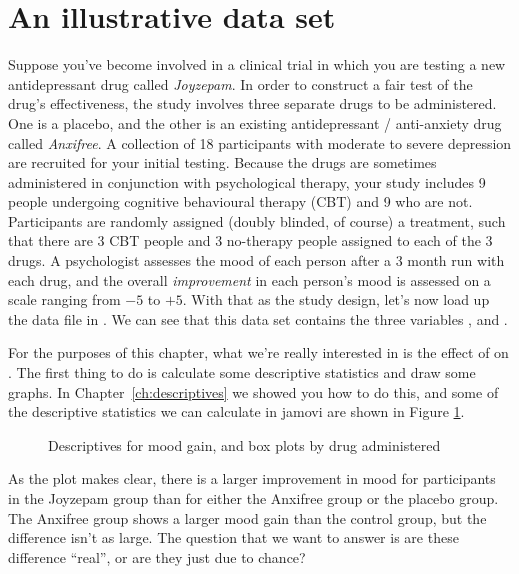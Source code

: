 \section{An illustrative data set~\label{sec:anxifree}}

Suppose you've become involved in a clinical trial in which you are testing a new antidepressant drug called {\it Joyzepam}. In order to construct a fair test of the drug's effectiveness, the study involves three separate drugs to be administered. One is a placebo, and the other is an existing antidepressant / anti-anxiety drug called {\it Anxifree}. A collection of 18 participants with moderate to severe depression are recruited for your initial testing. Because the drugs are sometimes administered in conjunction with psychological therapy, your study includes 9 people undergoing cognitive behavioural therapy (CBT) and 9 who are not. Participants are randomly assigned (doubly blinded, of course) a treatment, such that there are 3 CBT people and 3 no-therapy people assigned to each of the 3 drugs. A psychologist assesses the mood of each person after a 3 month run with each drug, and the overall {\it improvement} in each person's mood is assessed on a scale ranging from $-5$ to $+5$.  With that as the study design, let's now load up the data file in . We can see that this data set contains the three variables ,  and . 

For the purposes of this chapter, what we're really interested in is the effect of  on . The first thing to do is calculate some descriptive statistics and draw some graphs. In Chapter~\ref{ch:descriptives} we showed you how to do this, and some of the descriptive statistics we can calculate in jamovi are shown in Figure \ref{fig:anova1}.

\begin{figure}[ht]
\begin{center}
\caption{Descriptives for mood gain, and box plots by drug administered}
\HR
\label{fig:anova1}
\end{center}
\end{figure}

As the plot makes clear, there is a larger improvement in mood for participants in the Joyzepam group than for either the Anxifree group or the placebo group. The Anxifree group shows a larger mood gain than the control group, but the difference isn't as large. The question that we want to answer is are these difference ``real'', or are they just due to chance?


